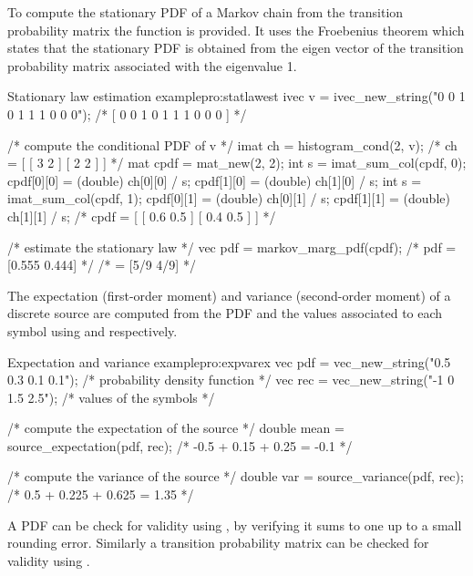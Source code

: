   To compute the stationary PDF of a Markov chain from the
    transition probability matrix the function 
     is
    provided. It uses the Froebenius theorem which states that the
    stationary PDF is obtained from the eigen vector of the transition
    probability matrix associated with the eigenvalue 1.  

\begin{program}{Stationary law estimation example}{pro:statlawest}
ivec v = ivec_new_string("0 0 1 0 1 1 1 0 0 0"); /* [ 0 0 1 0 1 1 1 0 0 0 ]  */

/* compute the conditional PDF of v */
imat ch = histogram_cond(2, v);                  /* ch = [ [ 3 2 ]
                                                           [ 2 2 ] ]         */
mat cpdf = mat_new(2, 2);
int s = imat_sum_col(cpdf, 0);
cpdf[0][0] = (double) ch[0][0] / s;
cpdf[1][0] = (double) ch[1][0] / s;
int s = imat_sum_col(cpdf, 1);
cpdf[0][1] = (double) ch[0][1] / s;
cpdf[1][1] = (double) ch[1][1] / s;
                                                 /* cpdf = [ [ 0.6 0.5 ]
                                                             [ 0.4 0.5 ] ]   */

/* estimate the stationary law */
vec pdf = markov_marg_pdf(cpdf);                 /* pdf = [0.555 0.444]      */
                                                 /*     = [5/9 4/9]          */
\end{program}

    The expectation (first-order moment) and variance (second-order
    moment) of a discrete source are computed from the PDF and the
    values associated to each symbol using 
     and 
    respectively.

\begin{program}{Expectation and variance example}{pro:expvarex}
vec pdf = vec_new_string("0.5 0.3 0.1 0.1"); /* probability density function */
vec rec = vec_new_string("-1 0 1.5 2.5");    /* values of the symbols        */

/* compute the expectation of the source */
double mean = source_expectation(pdf, rec);  /* -0.5 + 0.15 + 0.25 = -0.1    */

/* compute the variance of the source */
double var = source_variance(pdf, rec);      /* 0.5 + 0.225 + 0.625 = 1.35   */
\end{program}

    A PDF can be check for validity using , by verifying it
    sums to one up to a small rounding error. Similarly a transition
    probability matrix can be checked for validity using .


